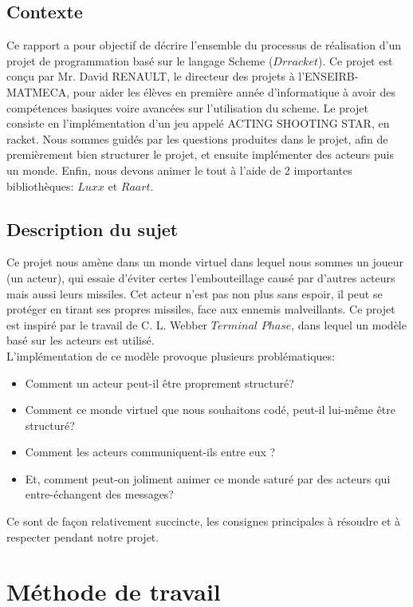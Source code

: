 \documentclass{article}
\begin{document}
    \subsection*{Contexte}
    Ce rapport a pour objectif de décrire l’ensemble du processus de réalisation d'un projet de programmation basé sur le langage Scheme ($Drracket$). Ce projet est conçu par Mr. David RENAULT, le directeur des projets à l'ENSEIRB-MATMECA, pour aider les élèves en première année d’informatique à avoir des compétences basiques voire avancées sur l'utilisation du scheme. Le projet consiste en l’implémentation d'un jeu appelé ACTING SHOOTING STAR, en racket. Nous sommes guidés par les questions produites dans le projet, afin de premièrement bien structurer le projet, et ensuite implémenter des acteurs puis un monde. Enfin, nous devons animer le tout à l'aide de 2 importantes bibliothèques: $Luxx$ et $Raart$.

    \subsection*{Description du sujet}
  Ce projet nous amène dans un monde virtuel dans lequel nous sommes un joueur (un acteur), qui essaie d'éviter certes l'embouteillage causé par d'autres acteurs mais aussi leurs missiles. Cet acteur n'est pas non plus sans espoir, il peut se protéger en tirant ses propres missiles, face aux ennemis malveillants. Ce projet est  inspiré par le travail de  C. L. Webber $Terminal$ $Phase$, dans lequel un modèle basé sur les acteurs est utilisé.
  \\
  L'implémentation de ce modèle provoque plusieurs problématiques:
  \begin{itemize}
    \item Comment un acteur peut-il être proprement structuré?  
    \item Comment ce monde virtuel que nous souhaitons codé, peut-il lui-même être structuré? 
    \item{Comment les acteurs communiquent-ils entre eux ?}
    \item Et, comment peut-on joliment animer ce monde saturé par des acteurs qui entre-échangent des messages? 
    \end{itemize}
  Ce sont de façon relativement succincte, les consignes principales à résoudre et à respecter pendant notre projet.
\newpage
 


 \section{Méthode de travail}
\end{document}
